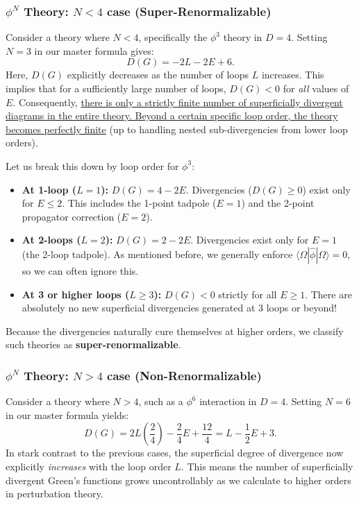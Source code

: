 \subsubsection{\(\phi^N\) Theory: \(N<4\) case (Super-Renormalizable)}

Consider a theory where \(N < 4\), specifically the \(\phi^3\) theory in \(D=4\). Setting \(N=3\) in our master formula gives:
\[
    D(G) = -2L - 2E + 6.
\]
Here, \(D(G)\) explicitly decreases as the number of loops \(L\) increases. This implies that for a sufficiently large number of loops, \(D(G) < 0\) for \textit{all} values of \(E\).
Consequently, \uline{there is only a strictly finite number of superficially divergent diagrams in the entire theory. Beyond a certain specific loop order, the theory becomes perfectly finite} (up to handling nested sub-divergencies from lower loop orders).

Let us break this down by loop order for \(\phi^3\):
\begin{itemize}
    \item \textbf{At 1-loop (\(L=1\)):} \(D(G) = 4 - 2E\). Divergencies (\(D(G) \geq 0\)) exist only for \(E \leq 2\). This includes the 1-point tadpole (\(E=1\)) and the 2-point propagator correction (\(E=2\)).
    \item \textbf{At 2-loops (\(L=2\)):} \(D(G) = 2 - 2E\). Divergencies exist only for \(E = 1\) (the 2-loop tadpole). As mentioned before, we generally enforce \(\langle \Omega | \hat{\phi} | \Omega \rangle = 0\), so we can often ignore this.
    \item \textbf{At 3 or higher loops (\(L \geq 3\)):} \(D(G) < 0\) strictly for all \(E \geq 1\). There are absolutely no new superficial divergencies generated at 3 loops or beyond!
\end{itemize}
Because the divergencies naturally cure themselves at higher orders, we classify such theories as \textbf{super-renormalizable}.

\subsubsection{\(\phi^N\) Theory: \(N>4\) case (Non-Renormalizable)}

Consider a theory where \(N > 4\), such as a \(\phi^6\) interaction in \(D=4\). Setting \(N=6\) in our master formula yields:
\[
    D(G) = 2L \left( \frac{2}{4} \right) - \frac{2}{4} E + \frac{12}{4} = L - \frac{1}{2} E + 3.
\]
In stark contrast to the previous cases, the superficial degree of divergence now explicitly \textit{increases} with the loop order \(L\). This means the number of superficially divergent Green's functions grows uncontrollably as we calculate to higher orders in perturbation theory.


